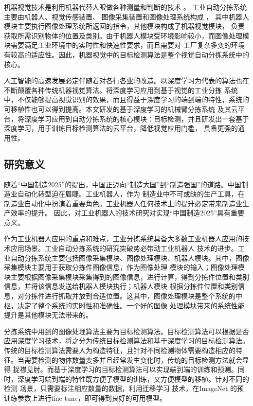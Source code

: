 机器视觉技术是利用机器代替人眼做各种测量和判断的技术    \cite{BZG:2015}。
工业自动分拣系统主要由机器人、视觉传感装置、
图像采集装置和图像处理系统构成  \cite{ZWH:2018}，
其中机器人模块主要执行图像处理系统所返回的指令，其他模块构成了机器视觉模块，
负责获取所需识别物体的位置及类别。由于机器人模块受环境影响较小，而图像处理模块需要满足工业环境中的实时性和快速性要求，而且需要对
工厂复杂多变的环境有较高的适应性。因此，机器视觉中的目标检测算法是整个视觉自动分拣系统中的核心。

人工智能的高速发展必定伴随着对各行各业的改造。以深度学习为代表的算法也在不断颠覆各种传统机器视觉算法。将深度学习应用到基于视觉的工业分拣
系统中，不仅能够提高视觉识别的效果，而且得益于深度学习的端到端的特性，系统的可移植性也可以得到提高。本文研发的基于深度学习的机械臂分拣系统
及其云平台，将深度学习应用到自动分拣系统的核心模块：目标检测，并且研发出一套基于深度学习，用于训练目标检测算法的云平台，降低视觉应用门槛，
具备更强的通用性。

\subsection{研究意义}

随着“中国制造2025”的提出，中国正迈向“制造大国”到“制造强国”的道路。中国制造业自动化转型迫在眉睫。工业机器人，作为
制造业中不可或缺的生产工具，在制造业自动化中扮演着重要角色。工业机器人任何技术上的提升必定带来制造业生产效率的提升。
因此，对工业机器人的技术研究对实现“中国制造2025”具有重要意义。

作为工业机器人应用的重点和难点，工业分拣系统具备大多数工业机器人应用的技术应用场景。工业自动分拣系统的研究突破势必带动工业机器人
技术的进步。工业自动分拣系统主要包括图像采集模块、图像处理模块、机器人模块。其中，图像采集模块主要用于获取分拣件图像信息，作为图像处理
模块的输入；图像处理模块主要根据图像采集模块采集得到的图像信息，进行计算，得到分拣件位置和类别信息，并将该信息发送给机器人模块执行；机器人模块
根据分拣件位置和类别信息，对分拣件进行抓取并放到合适位置。这其中，图像处理模块是整个系统的中枢，决定了整个系统的实时性和准确性。一个好的图像
处理模块带来的系统性能提升是其他模块无法带来的。

分拣系统中用到的图像处理算法主要为目标检测算法。目标检测算法可以根据是否应用深度学习技术，将之分为传统目标检测算法和基于深度学习的目标检测算法。
传统的目标检测算法需要人为构造特征，且针对不同检测物体需要构造相应的特征。当需要检测的物体数量变多并且经常发生变化时，传统的目标检测方法就会显得
捉襟见肘。而基于深度学习的目标检测算法可以实现端到端的训练和预测。同时，深度学习端到端的特性既方便了模型的训练，又方便模型的移植。针对不同的检测
场景，只需要标注相应数量的数据，利用迁移学习    \cite{TransferL:2010}
技术，在ImageNet  \cite{ImageNet:2009}
的预训练参数上进行fine-tune，即可得到良好的可用模型。

